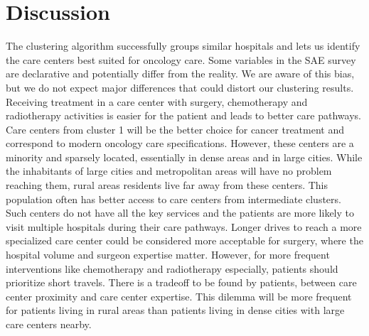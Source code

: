 \begin{table}[!ht]
{    }
    \label{table:oncology-activity-per-region}
\end{table}

\section{Discussion}

The clustering algorithm successfully groups similar hospitals and lets us identify the care centers best suited for oncology care. Some variables in the SAE survey are declarative and potentially differ from the reality. We are aware of this bias, but we do not expect major differences that could distort our clustering results.
Receiving treatment in a care center with surgery, chemotherapy and radiotherapy activities is easier for the patient and leads to better care pathways. Care centers from cluster 1 will be the better choice for cancer treatment and correspond to modern oncology care specifications. However, these centers are a minority and sparsely located, essentially in dense areas and in large cities. While the inhabitants of large cities and metropolitan areas will have no problem reaching them, rural areas residents live far away from these centers. This population often has better access to care centers from intermediate clusters. Such centers do not have all the key services and the patients are more likely to visit multiple hospitals during their care pathways.
Longer drives to reach a more specialized care center could be considered more acceptable for surgery, where the hospital volume and surgeon expertise matter. However, for more frequent interventions like chemotherapy and radiotherapy especially, patients should prioritize short travels. There is a tradeoff to be found by patients, between care center proximity and care center expertise. This dilemma will be more frequent for patients living in rural areas than patients living in dense cities with large care centers nearby.

